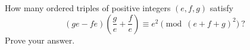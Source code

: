 How many ordered triples of positive integers $(e,f,g)$ satisfy
\[
(ge-fe)\left(\dfrac {g}{e}+\dfrac {f}{e}\right)\equiv e^2\pmod{(e+f+g)^2}\ ?
\]
Prove your answer.
